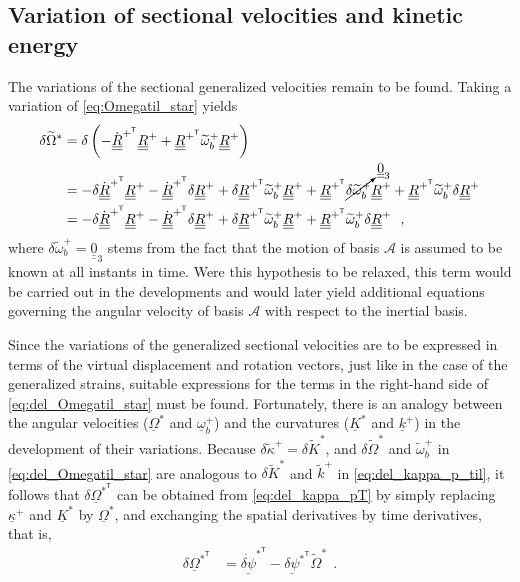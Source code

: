 \documentclass[12pt,a4paper,oneside,english]{abntex2} %
\newcommand{\vect}[1]{\underline{#1}}
\def\tens#1{\underline{\underline{#1}}}
\def\til#1{\widetilde{#1}}
\def\lp{\left(}
\def\rp{\right)}
\def\T{\mathsf{T}}
\def\A{\mathcal{A}}
\def\zthree{\tens{0}_3}
\def\R{\tens{R}}
\def\Rp{\R^+}
\def\RpT{\R^{+^\T}}
\def\RpTdot{\dot{\R}^{+^\T}}
\def\om{\vect{\omega}_b}
\def\omp{\om^{+}}
\def\omtil{\til{\omega}_b}
\def\omtilp{\omtil^{+}}
\def\kap{\vect{\kappa}}
\def\kapp{\kap^{+}}
\def\kapptil{\til{\kappa}^{+}}
\def\k{\vect{k}}
\def\kp{\k^{+}}
\def\ktil{\til{k}}
\def\ktilp{\ktil^{+}}
\def\K{\vect{K}}
\def\Ks{\K^{*}}
\def\Ktil{\til{K}}
\def\Ktils{\Ktil^{*}}
\def\Om{\vect{\Omega}}
\def\Oms{\Om^{*}}
\def\OmsT{\Om^{*^\T}}
\def\Omtil{\til{\Omega}}
\def\Omtils{\Omtil^{*}}
\def\delpsi{\vect{\delta\psi}}
\def\delpsisT{\delpsi^{*^\T}}
\def\delpsidot{\dot{\delpsi}}
\def\delpsisdotT{\delpsidot^{*^\T}}
\begin{document}
\begin{apendicesenv}
\section{Variation of sectional velocities and kinetic energy}
\label{sec:vel_K}

The variations of the sectional generalized velocities remain to be found. Taking a variation of \cref{eq:Omegatil_star} yields
\begin{align}
    \delta\Omtils &= \delta\lp -\RpTdot\Rp + \RpT\omtilp\Rp \rp \nonumber 
    \\
    &= -\delta\RpTdot\Rp - \RpTdot\delta\Rp + \delta\RpT\omtilp\Rp + \RpT\cancelto{\zthree}{\delta\omtilp}\Rp + \RpT\omtilp\delta\Rp \nonumber 
    \\
    &= -\delta\RpTdot\Rp - \RpTdot\delta\Rp + \delta\RpT\omtilp\Rp + \RpT\omtilp\delta\Rp \ \ ,
    \label{eq:del_Omegatil_star}
\end{align}
where $\delta\omtilp = \zthree$ stems from the fact that the motion of basis $\A$ is assumed to be known at all instants in time. Were this hypothesis to be relaxed, this term would be carried out in the developments and would later yield additional equations governing the angular velocity of basis $\A$ with respect to the inertial basis.

Since the variations of the generalized sectional velocities are to be expressed in terms of the virtual displacement and rotation vectors, just like in the case of the generalized strains, suitable expressions for the terms in the right-hand side of \cref{eq:del_Omegatil_star} must be found. Fortunately, there is an analogy between the angular velocities ($\Oms$ and $\omp$) and the curvatures ($\Ks$ and $\kp$) in the development of their variations. Because $\delta\kapptil = \delta\Ktils$, and $\delta\Omtils$ and $\omtilp$ in \cref{eq:del_Omegatil_star} are analogous to $\delta\Ktils$ and $\ktilp$ in \cref{eq:del_kappa_p_til}, it follows that $\delta\OmsT$ can be obtained from \cref{eq:del_kappa_pT} by simply replacing $\kapp$ and $\Ks$ by $\Oms$, and exchanging the spatial derivatives by time derivatives, that is,
\begin{align}
    \delta\OmsT &= \delpsisdotT - \delpsisT\Omtils \ \ .
    \label{eq:del_OmsT}
\end{align}


\end{apendicesenv}
\end{document}
